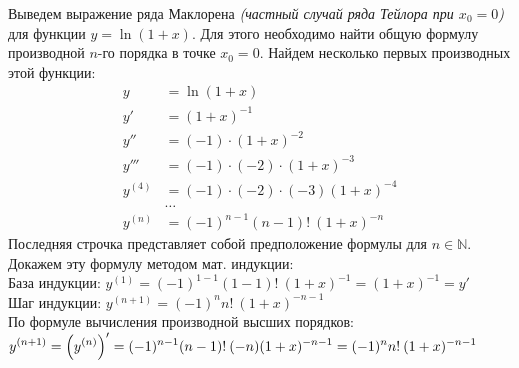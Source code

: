  {
     Выведем выражение ряда Маклорена \textit{(частный случай ряда Тейлора при $x_0 = 0$)} для функции $y = \ln{(1+x)}$. Для этого необходимо найти общую формулу производной $n\text{-го}$ порядка в точке $x_0 = 0$. Найдем несколько первых производных этой функции:
    \begin{align*}
        y &= \ln(1+x) \\
        y' &= (1+x)^{-1} \\
        y'' &= (-1)\cdot(1+x)^{-2} \\
        y''' &= (-1)\cdot(-2)\cdot(1+x)^{-3} \\
        y^{(4)} &= (-1)\cdot(-2)\cdot(-3)(1+x)^{-4} \\
        &\ldots \\
        y^{(n)} &= (-1)^{n-1}(n-1)!\:(1+x)^{-n}
    \end{align*}
    Последняя строчка представляет собой предположение формулы для $n \in \mathbb{N}$. Докажем эту формулу методом мат. индукции: \\

    База индукции: $\displaystyle y^{(1)} = (-1)^{1 - 1}(1 - 1)!\:(1+x)^{-1} = (1+x)^{-1} = y'$ \\
    \indent Шаг индукции: $\displaystyle y^{(n+1)} = (-1)^nn!\:(1+x)^{-n-1}$\\
    \indent По формуле вычисления производной высших порядков: \\
    \indent $\displaystyle y^{(n+1)} = \left( {y^{(n)}} \right)'=(-1)^{n-1}(n-1)!\:(-n)(1+x)^{-n-1} = (-1)^{n}n!\:(1+x)^{-n-1}$\\[2mm]
            
}
